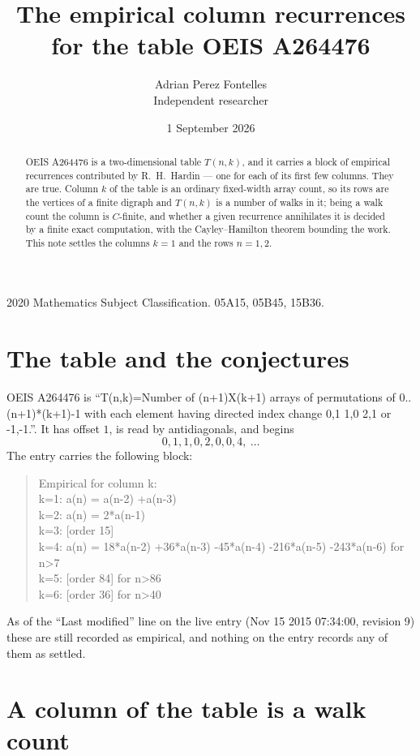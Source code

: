 \documentclass[11pt,a4paper]{article}
\title{The empirical column recurrences for the table OEIS A264476}
\author{Adrian Perez Fontelles\\ \small Independent researcher}
\date{1 September 2026}
\theoremstyle{plain}
\theoremstyle{definition}
\begin{document}
\maketitle

\begin{abstract}
OEIS A264476 is a two-dimensional table $T(n,k)$, and it carries a block of empirical
recurrences contributed by R.~H.~Hardin --- one for each of its first few columns. They are
true. Column $k$ of the table is an ordinary fixed-width array count, so its rows are the
vertices of a finite digraph and $T(n,k)$ is a number of walks in it; being a walk count the
column is $C$-finite, and whether a given recurrence annihilates it is decided by a finite
exact computation, with the Cayley--Hamilton theorem bounding the work. This note settles the columns $k=1$ and the rows $n=1, 2$.
\end{abstract}

\noindent\small 2020 Mathematics Subject Classification. 05A15, 05B45, 15B36.\normalsize

\section{The table and the conjectures}

OEIS A264476 is ``T(n,k)=Number of (n+1)X(k+1) arrays of permutations of 0..(n+1)*(k+1)-1 with each element having directed index change 0,1 1,0 2,1 or -1,-1.''. It has offset $1$, is
read by antidiagonals, and begins
\[
0, 1, 1, 0, 2, 0, 0, 4,\ \dots
\]
The entry carries the following block:
\begin{quote}\small
Empirical for column k:\\
k=1: a(n) = a(n-2) +a(n-3)\\
k=2: a(n) = 2*a(n-1)\\
k=3: [order 15]\\
k=4: a(n) = 18*a(n-2) +36*a(n-3) -45*a(n-4) -216*a(n-5) -243*a(n-6) for n>7\\
k=5: [order 84] for n>86\\
k=6: [order 36] for n>40\\
\end{quote}
As of the ``Last modified'' line on the live entry (Nov 15 2015 07:34:00, revision 9) these are still
recorded as empirical, and nothing on the entry records any of them as settled.

\section{A column of the table is a walk count}
\end{document}
